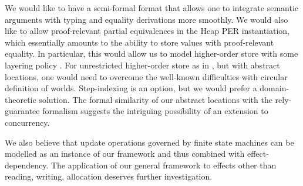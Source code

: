 \documentclass[orivec]{llncs}
\newif\iffull\fullfalse
\begin{document}
\iffull
For a while we worked with groupoids instead of setoids.  At some
point though we found that the required equations between proofs are
needed only to establish other such equations, never in order to prove
something that does not mention them and we thus took the somewhat
bold step to give up all equations between proofs leading us to
setoids. Should we ever want to model dependent types where the index
types are already nontrivial setoids then the passage to groupoids would
become necessary for then, by way of substitution, equality proofs
interfere with actual (semantic) terms. E.g.\ if  then we
expect a function  from  to .
\fi

We would like to have a semi-formal format that allows one to
integrate semantic arguments with typing and equality derivations more
smoothly. We would also like to allow proof-relevant partial
equivalences in the Heap PER instantiation, which essentially amounts
to the ability to store values with proof-relevant equality. In
particular, this would allow us to model higher-order store with some
layering policy  \cite{DBLP:journals/iandc/Boudol10}. For
unrestricted higher-order store as in
\cite{DBLP:conf/icfp/ThamsborgB11}, but with abstract locations, one
would need to overcome the well-known difficulties with circular
definition of worlds. Step-indexing \cite{DBLP:conf/esop/Ahmed06} is
an option, but we would prefer a domain-theoretic solution. The formal
similarity of our abstract locations with the rely-guarantee formalism
\cite{DBLP:journals/logcom/ColemanJ07,DBLP:conf/concur/VafeiadisP07}
suggests the intriguing possibility of an extension to concurrency.

We also believe that update operations governed by finite state
machines \cite{DBLP:conf/popl/AhmedDR09} can
be modelled as an instance of our framework and thus combined with
effect-dependency. The application of our general framework to effects other
than reading, writing, allocation deserves further investigation.
\end{document}
